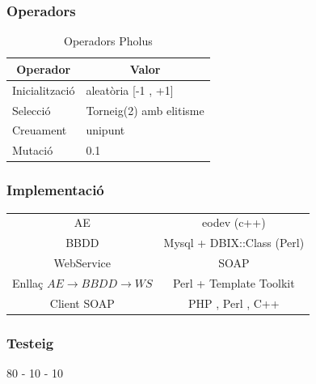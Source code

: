 \documentclass{beamer}
\begin{document}

\begin{frame}
\frametitle{Operadors}


\begin{table}
\centering
\begin{tabular}{|l|l|}
\hline
\multicolumn{1}{|c|}{\textbf{Operador }} & \multicolumn{1}{c|}{\textbf{ Valor}} \\
\hline
\hline
Inicialització & aleatòria [-1 , +1] \\
Selecció       & Torneig(2) amb elitisme  \\
Creuament       &  unipunt        \\
Mutació        &   0.1                  \\
\hline
\end{tabular}
\caption{Operadors Pholus}
\end{table}

\end{frame}

\begin{frame}
\frametitle{Implementació}
\begin{tabular}[h!]{|c|c|}
	AE                                         & eodev (c++)                \\ 
	BBDD                                       & Mysql + DBIX::Class (Perl) \\ 
	WebService                                 & SOAP                       \\ 
	Enllaç $AE\rightarrow BBDD\rightarrow WS$  & Perl + Template Toolkit    \\ 
	Client SOAP                                & PHP , Perl , C++           \\ 
\end{tabular}
\end{frame}

\begin{frame}
	\frametitle{Testeig}
	80 - 10 - 10
\end{frame}

\end{document}
